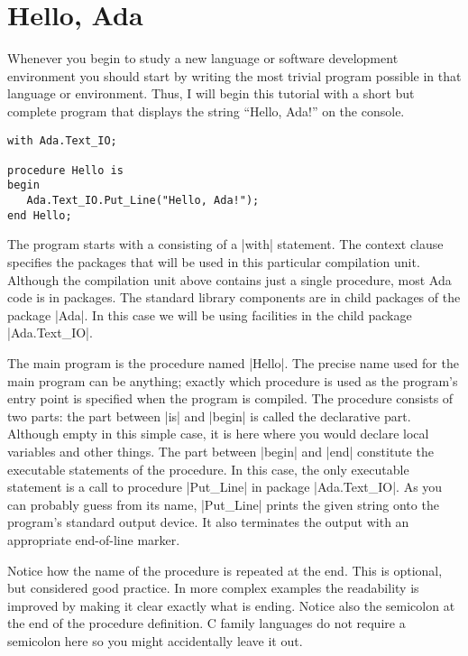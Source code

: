 \section{Hello, Ada}
\label{sec:hello-ada}

Whenever you begin to study a new language or software development environment you should start
by writing the most trivial program possible in that language or environment. Thus, I will begin
this tutorial with a short but complete program that displays the string ``Hello, Ada!'' on the
console.

\label{lst:hello-ada}
\begin{lstlisting}
with Ada.Text_IO;

procedure Hello is
begin
   Ada.Text_IO.Put_Line("Hello, Ada!");
end Hello;
\end{lstlisting}

\noindent The program starts with a  consisting of a |with| statement.
The context clause specifies the packages that will be used in this particular compilation unit.
Although the compilation unit above contains just a single procedure, most Ada code is in
packages. The standard library components are in child packages of the package |Ada|. In this
case we will be using facilities in the child package |Ada.Text_IO|.

The main program is the procedure named |Hello|. The precise name used for the main program can
be anything; exactly which procedure is used as the program's entry point is specified when the
program is compiled. The procedure consists of two parts: the part between |is| and |begin| is
called the declarative part. Although empty in this simple case, it is here where you would
declare local variables and other things. The part between |begin| and |end| constitute the
executable statements of the procedure. In this case, the only executable statement is a call to
procedure |Put_Line| in package |Ada.Text_IO|. As you can probably guess from its name,
|Put_Line| prints the given string onto the program's standard output device. It also terminates
the output with an appropriate end-of-line marker.

Notice how the name of the procedure is repeated at the end. This is optional, but considered
good practice. In more complex examples the readability is improved by making it clear exactly
what is ending. Notice also the semicolon at the end of the procedure definition. C family
languages do not require a semicolon here so you might accidentally leave it out.

